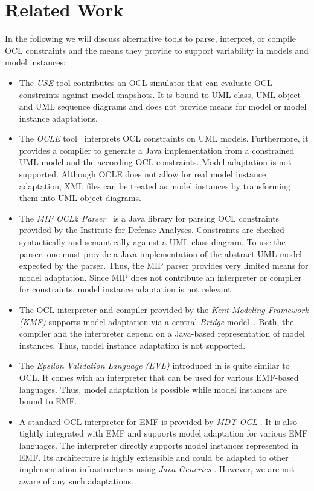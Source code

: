 \section{Related Work}
In the following we will discuss alternative tools to parse,
interpret, or compile OCL constraints and the means they provide
to support variability in models and model instances:

\begin{itemize}
  
\item The \emph{USE} tool \cite{gogolla2007use} contributes an OCL simulator that can
evaluate OCL constraints against model snapshots. It is bound to UML class, UML object and
UML sequence diagrams and does not provide means for model or model instance
adaptations.

\item The \emph{OCLE} tool~\cite{WWW:OCLE} interprets OCL constraints on
UML models. Furthermore, it provides a compiler to generate a Java
implementation from a constrained UML model and the according OCL 
constraints. Model adaptation is not supported. Although OCLE does not allow for
real model instance adaptation, XML files can be treated as model instances by
transforming them into UML object diagrams.

\item The \emph{MIP OCL2 Parser}~\cite{WWW:MIP} is a Java library for parsing OCL
constraints provided by the Institute for Defense Analyses. Constraints are
checked syntactically and semantically against a UML class diagram.
To use the parser, one must provide a Java implementation of the abstract 
UML model expected by the parser. Thus,
the MIP parser provides very limited means for model adaptation. Since MIP does
not contribute an interpreter or compiler for constraints, model
instance adaptation is not relevant.

\item The OCL interpreter and compiler provided by the \emph{Kent Modeling Framework
(KMF)} supports model adaptation via a central \emph{Bridge}
model~\cite{akehurst2003ocl}. Both, the compiler and the interpreter depend on a
Java-based representation of model instances. Thus, model instance adaptation is not
supported.

\item The \emph{Epsilon Validation Language (EVL)} introduced in
\cite{kolovos2008detecting} is quite similar to OCL. It comes with an
interpreter that can be used for various EMF-based languages. Thus, model
adaptation is possible while model instances are bound to EMF.
 
\item A standard OCL interpreter for EMF is provided by \emph{MDT OCL}
\cite{WWW:MDT}. It is also tightly integrated with EMF and supports 
model adaptation for various EMF languages. The interpreter directly supports
model instances represented in EMF. Its architecture is highly extensible
and could be adapted to other implementation
infrastructures using \emph{Java Generics} \cite{damus:EclipseCon08}. 
However, we are not aware of any such adaptations.

\end{itemize}

